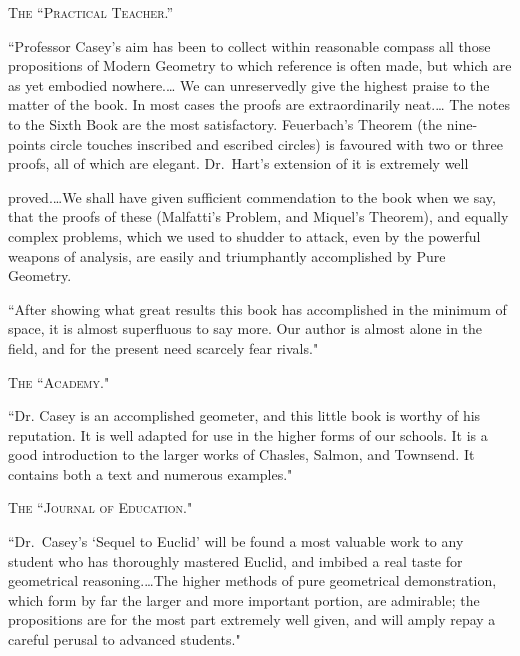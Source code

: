\documentclass[oneside]{book}
\begin{document}
\bigskip
\begin{center}
\textsc{The ``Practical Teacher.''}
\end{center}
\nopagebreak

\begin{footnotesize}
``Professor Casey's aim has been to collect within reasonable
compass all those propositions of Modern Geometry to which
reference is often made, but which are as yet embodied nowhere.\ldots
We can unreservedly give the highest praise to the matter
of the book. In most cases the proofs are extraordinarily neat.\ldots
The notes to the Sixth Book are the most satisfactory.
Feuerbach's Theorem (the nine-points circle touches inscribed
and escribed circles) is favoured with two or three proofs, all of
which are elegant. Dr.~Hart's extension of it is extremely well

proved.\ldots We shall have given sufficient commendation
to the book when we say, that the proofs of these (Malfatti's
Problem, and Miquel's Theorem), and equally complex problems,
which we used to shudder to attack, even by the powerful weapons
of analysis, are easily and triumphantly accomplished by
Pure Geometry.

``After showing what great results this book has accomplished
in the minimum of space, it is almost superfluous to say more.
Our author is almost alone in the field, and for the present need
scarcely fear rivals."
\end{footnotesize}

\bigskip
\begin{center}
\textsc{The ``Academy."}
\end{center}
\nopagebreak

\begin{footnotesize}
``Dr. Casey is an accomplished geometer, and this little book
is worthy of his reputation. It is well adapted for use in the
higher forms of our schools. It is a good introduction to the
larger works of Chasles, Salmon, and Townsend. It contains
both a text and numerous examples."
\end{footnotesize}

\bigskip
\begin{center}
\textsc{The ``Journal of Education."}
\end{center}
\nopagebreak

\begin{footnotesize}
``Dr.~Casey's `Sequel to Euclid' will be found a most valuable
work to any student who has thoroughly mastered Euclid, and
imbibed a real taste for geometrical reasoning.\ldots The
higher methods of pure geometrical demonstration, which form
by far the larger and more important portion, are admirable; the
propositions are for the most part extremely well given, and will
amply repay a careful perusal to advanced students."


\end{footnotesize}
\end{document}
